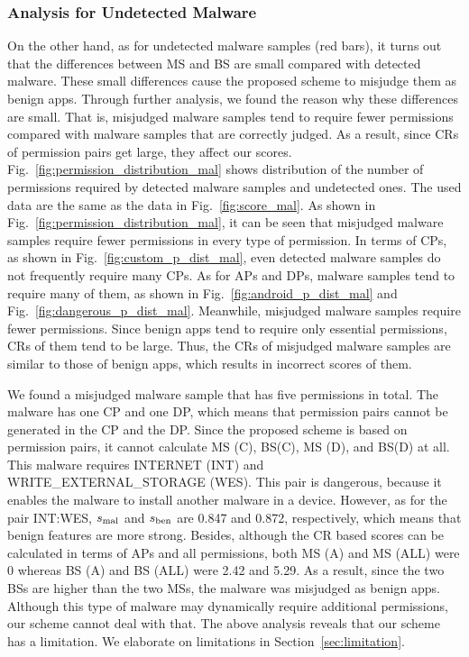 \documentclass{ieeeaccess}
\newcommand{\myfigurename}{Fig.}
\begin{document}
\subsubsection{Analysis for Undetected Malware}
On the other hand, as for undetected malware samples (red bars), it turns out that the differences between MS and BS are small compared with detected malware.
These small differences cause the proposed scheme to misjudge them as benign apps.
Through further analysis, we found the reason why these differences are small.
That is, misjudged malware samples tend to require fewer permissions compared with malware samples that are correctly judged.
As a result, since CRs of permission pairs get large, they affect our scores.
\myfigurename~\ref{fig:permission_distribution_mal} shows distribution of the number of permissions required by detected malware samples and undetected ones.
The used data are the same as the data in \myfigurename~\ref{fig:score_mal}.
As shown in \myfigurename~\ref{fig:permission_distribution_mal}, it can be seen that misjudged malware samples require fewer permissions in every type of permission.
In terms of CPs, as shown in \myfigurename~\ref{fig:custom_p_dist_mal}, even detected malware samples do not frequently require many CPs.
As for APs and DPs, malware samples tend to require many of them, as shown in \myfigurename~\ref{fig:android_p_dist_mal} and \myfigurename~\ref{fig:dangerous_p_dist_mal}.
Meanwhile, misjudged malware samples require fewer permissions.
Since benign apps tend to require only essential permissions, CRs of them tend to be large.
Thus, the CRs of misjudged malware samples are similar to those of benign apps, which results in incorrect scores of them.

We found a misjudged malware sample that has five permissions in total.
The malware has one CP and one DP, which means that permission pairs cannot be generated in the CP and the DP.
Since the proposed scheme is based on permission pairs, it cannot calculate MS (C), BS(C), MS (D), and BS(D) at all.
This malware requires INTERNET (INT) and WRITE\_EXTERNAL\_STORAGE (WES).
This pair is dangerous, because it enables the malware to install another malware in a device.
However, as for the pair INT:WES, $s_{\mathrm{mal}}$ and $s_{\mathrm{ben}}$ are 0.847 and 0.872, respectively, which means that benign features are more strong.
Besides, although the CR based scores can be calculated in terms of APs and all permissions, both MS (A) and MS (ALL) were 0 whereas BS (A) and BS (ALL) were 2.42 and 5.29.
As a result, since the two BSs are higher than the two MSs, the malware was misjudged as benign apps.  
Although this type of malware may dynamically require additional permissions, our scheme cannot deal with that.
The above analysis reveals that our scheme has a limitation.
We elaborate on limitations in Section~\ref{sec:limitation}.
\end{document}
